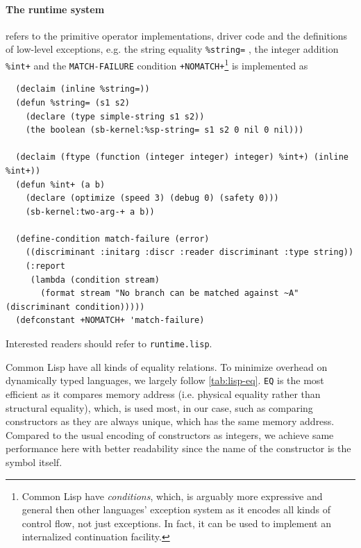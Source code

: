 \documentclass[a4paper, 11pt]{article}
\theoremstyle{remark}\newtheorem*{remark}{Remark}
\theoremstyle{definition}\newtheorem*{definition}{Definition}
\begin{document}
\paragraph{The runtime system} refers to the primitive operator implementations, driver code and
the definitions of low-level exceptions, e.g. the string equality \texttt{\%string=}
, the integer addition \texttt{\%int+} and the \texttt{MATCH-FAILURE} condition \texttt{+NOMATCH+}\footnote{
Common Lisp have \emph{conditions}, which, is arguably more expressive and general then
other languages' exception system as it encodes all kinds of control flow, not just exceptions.
In fact, it can be
used to implement an internalized continuation facility.
}
is implemented as
\begin{verbatim}
  (declaim (inline %string=))
  (defun %string= (s1 s2)
    (declare (type simple-string s1 s2))
    (the boolean (sb-kernel:%sp-string= s1 s2 0 nil 0 nil)))

  (declaim (ftype (function (integer integer) integer) %int+) (inline %int+))
  (defun %int+ (a b)
    (declare (optimize (speed 3) (debug 0) (safety 0)))
    (sb-kernel:two-arg-+ a b))

  (define-condition match-failure (error)
    ((discriminant :initarg :discr :reader discriminant :type string))
    (:report
     (lambda (condition stream)
       (format stream "No branch can be matched against ~A" (discriminant condition)))))
  (defconstant +NOMATCH+ 'match-failure)
\end{verbatim}
Interested readers should refer to \texttt{runtime.lisp}.

Common Lisp have all kinds of equality relations. To minimize overhead on dynamically typed languages, we largely follow \autoref{tab:lisp-eq}.
\texttt{EQ} is the most efficient as it compares memory address
(i.e. physical equality rather than structural equality), which,
is used most, in our case,
such as comparing constructors as they are always unique, which has the same memory address.
Compared to the usual encoding of constructors as integers, we achieve same performance here with
better readability since the name of the constructor is the symbol itself.
\end{document}
